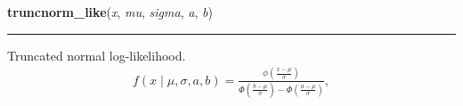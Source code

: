     \label{pymc:distributions:truncnorm_like}

    \vspace{0.5ex}

\hspace{.8\funcindent}\begin{boxedminipage}{\funcwidth}

    \raggedright \textbf{truncnorm\_like}(\textit{x}, \textit{mu}, \textit{sigma}, \textit{a}, \textit{b})

    \vspace{-1.5ex}

    \rule{\textwidth}{0.5\fboxrule}
\setlength{\parskip}{2ex}

Truncated normal log-likelihood.
\begin{equation*}\begin{split}f(x \mid \mu, \sigma, a, b) = \frac{\phi(\frac{x-\mu}{\sigma})} {\Phi(\frac{b-\mu}{\sigma}) - \Phi(\frac{a-\mu}{\sigma})},\end{split}\end{equation*}\setlength{\parskip}{1ex}
    \end{boxedminipage}

    \label{pymc:distributions:uniform_like}

    \vspace{0.5ex}

